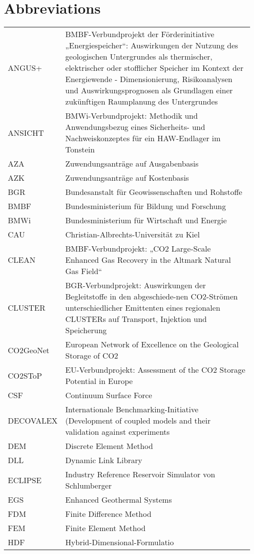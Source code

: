 \section{Abbreviations}


\small
\begin{longtable}{p{2cm}p{9.5cm}}
ANGUS+ & BMBF-Verbundprojekt der Förderinitiative „Energiespeicher“: Auswirkungen der Nutzung des geologischen Untergrundes als thermischer, elektrischer oder stofflicher Speicher im Kontext der Energiewende - Dimensionierung, Risikoanalysen und Auswirkungsprognosen als Grundlagen einer zukünftigen Raumplanung des Untergrundes \\
%
ANSICHT & BMWi-Verbundprojekt: Methodik und Anwendungsbezug eines Sicherheits- und Nachweiskonzeptes für ein HAW-Endlager im Tonstein \\
%
AZA & Zuwendungsanträge auf Ausgabenbasis \\
%
AZK & Zuwendungsanträge auf Kostenbasis \\
%
BGR & Bundesanstalt für Geowissenschaften und Rohstoffe \\
%
BMBF & Bundesministerium für Bildung und Forschung \\
%
BMWi & Bundesministerium für Wirtschaft und Energie \\
%
CAU & Christian-Albrechts-Universität zu Kiel \\
%
CLEAN & BMBF-Verbundprojekt: „CO2 Large-Scale Enhanced Gas Recovery in the Altmark Natural Gas Field“ \\
%
CLUSTER & BGR-Verbundprojekt: Auswirkungen der Begleitstoffe in den abgeschiede-nen CO2-Strömen unterschiedlicher Emittenten eines regionalen CLUSTERs auf Transport, Injektion und Speicherung \\
%
CO2GeoNet & European Network of Excellence on the Geological Storage of CO2 \\
%
CO2SToP & EU-Verbundprojekt: Assessment of the CO2 Storage Potential in Europe \\
%
CSF & Continuum Surface Force \\
%
DECOVALEX & Internationale Benchmarking-Initiative (Development of coupled models and their validation against experiments \\
%
DEM & Discrete Element Method \\
%
DLL & Dynamic Link Library \\
%
ECLIPSE & Industry Reference Reservoir Simulator von Schlumberger \\
%
EGS & Enhanced Geothermal Systems \\
%
FDM & Finite Difference Method \\
%
FEM & Finite Element Method \\
%
HDF & Hybrid-Dimensional-Formulatio \\

\end{longtable}
\normalsize

 
 
 
 
 